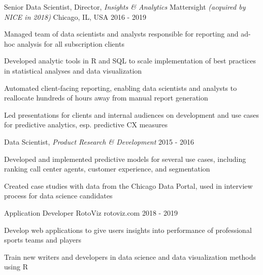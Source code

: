 \begin{cventries}
 \cventry
    {Senior Data Scientist, Director, \textit{Insights \& Analytics}} %
    {Mattersight \textit{\textmd{(acquired by NICE in 2018)}}} %
    {Chicago, IL, USA} %
    {2016 - 2019} %
    {
      \begin{cvitems}
        \item {Managed team of data scientists and analysts responsible for reporting and ad-hoc analysis for all subscription clients}
        \item {Developed analytic tools in R and SQL to scale implementation of best practices in statistical analyses and data visualization}
        \item {Automated client-facing reporting, enabling data scientists and analysts to reallocate hundreds of hours away from manual report generation}
        \item {Led presentations for clients and internal audiences on development and use cases for predictive analytics, esp. predictive CX measures}
      \end{cvitems}
    }

  \cventry
    {Data Scientist, \textit{Product Research \& Development}} %
    {} %
    {} %
    {2015 - 2016} %
    {
      \begin{cvitems} %
        \item {Developed and implemented predictive models for several use cases, including ranking call center agents, customer experience, and segmentation}
        \item {Created case studies with data from the Chicago Data Portal, used in interview process for data science candidates}
      \end{cvitems}
    }

 \cventry
    {Application Developer}
    {RotoViz}
    {rotoviz.com}
    {2018 - 2019}
    {
     \begin{cvitems}
       \item {Develop web applications to give users insights into performance of professional sports teams and players}
       \item {Train new writers and developers in data science and data visualization methods using R}
     \end{cvitems}
   }
   

\end{cventries}
